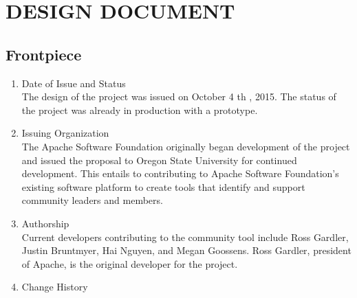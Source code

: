 \documentclass[draftclsnofoot,10pt,onecolumn]{IEEEtran} %
\begin{document}
\newpage
\section{DESIGN DOCUMENT}

\subsection{Frontpiece}
	\begin{enumerate}
	
		\item Date of Issue and Status \\
		The design of the project was issued on October 4 th , 2015. The status of the project was already in production with a
		prototype.\\
		
		\item Issuing Organization \\
		The Apache Software Foundation originally began development of the project and issued the proposal to Oregon
		State University for continued development. This entails to contributing to Apache Software Foundation’s existing
		software platform to create tools that identify and support community leaders and members.\\
		
		\item Authorship \\
		Current developers contributing to the community tool include Ross Gardler, Justin Bruntmyer, Hai Nguyen, and
		Megan Goossens. Ross Gardler, president of Apache, is the original developer for the project.\\
		
		\item Change History \\
		
	\end{enumerate}
	
\end{document}
